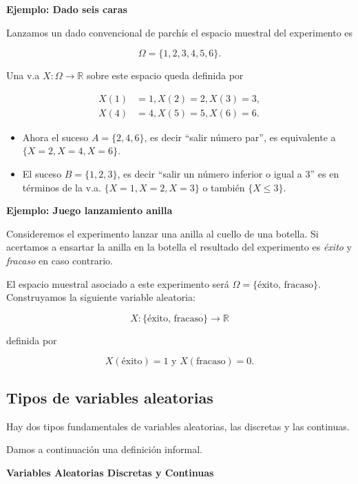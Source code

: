 \documentclass[]{book}
\providecommand{\tightlist}{%
  \setlength{\itemsep}{0pt}\setlength{\parskip}{0pt}}
\begin{document}
\textbf{Ejemplo: Dado seis caras}

Lanzamos un dado convencional de parchís el espacio muestral del experimento es

\[\Omega=\{1,2, 3, 4,  5, 6\}.\]

Una v.a \(X:\Omega\to\mathbb{R}\)
sobre este espacio queda definida por

\begin{equation*}
\begin{split}
X(1)&=1,X(2)=2,X(3)=3,\\
X(4)&=4,X(5)=5,X(6)=6.
\end{split}
\end{equation*}

\begin{itemize}
\tightlist
\item
  Ahora el suceso \(A=\{2, 4, 6\}\), es decir ``salir
  número par'', es equivalente a \(\{X=2,X=4,X=6\}\).
\item
  El suceso \(B=\{1,2,3\}\), es decir ``salir un número
  inferior o igual a \(3\)'' es en términos de la v.a. \(\{X=1,X=2,X=3\}\) o también \(\{X\leq 3\}\).
\end{itemize}

\textbf{Ejemplo: Juego lanzamiento anilla}

Consideremos el experimento lanzar una anilla al cuello de una botella. Si acertamos a
ensartar la anilla en la botella el resultado del experimento es \emph{éxito} y
\emph{fracaso} en caso contrario.

El espacio muestral asociado a este experimento será
\(\Omega=\{\mbox{éxito, fracaso}\}\). Construyamos la siguiente variable aleatoria:

\[X:\{\mbox{éxito, fracaso}\}\to\mathbb{R}\]

definida por

\[X(\mbox{éxito})=1 \mbox{ y } X(\mbox{fracaso})=0.\]

\hypertarget{tipos-de-variables-aleatorias}{%
\subsection{Tipos de variables aleatorias}\label{tipos-de-variables-aleatorias}}

Hay dos tipos fundamentales de variables aleatorias, las discretas y las continuas.

Damos a continuación una definición informal.

\textbf{Variables Aleatorias Discretas y Continuas}
\end{document}
